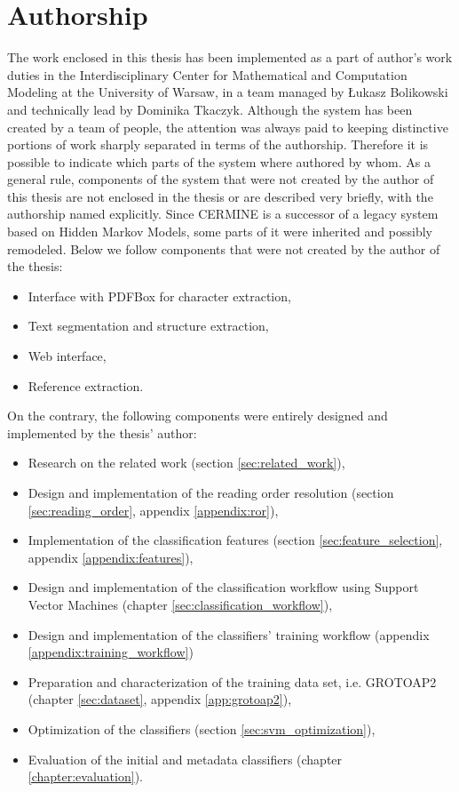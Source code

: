 \section{Authorship}

The work enclosed in this thesis has been implemented as a part of author's work duties in the Interdisciplinary Center for Mathematical and Computation Modeling at the University of Warsaw, in a team managed by Łukasz Bolikowski and technically lead by Dominika Tkaczyk. Although the system has been created by a team of people, the attention was always paid to keeping distinctive portions of work sharply separated in terms of the authorship. Therefore it is possible to indicate which parts of the system where authored by whom. As a general rule, components of the system that were not created by the author of this thesis are not enclosed in the thesis or are described very briefly, with the authorship named explicitly. Since CERMINE is a successor of a legacy system based on Hidden Markov Models, some parts of it were inherited and possibly remodeled. Below we follow components that were not created by the author of the thesis:
\begin{itemize}
\item Interface with PDFBox for character extraction,
\item Text segmentation and structure extraction,
\item Web interface,
\item Reference extraction.
\end{itemize}

On the contrary, the following components were entirely designed and implemented by the thesis' author:
\begin{itemize}
\item Research on the related work (section \ref{sec:related_work}),
\item Design and implementation of the reading order resolution (section \ref{sec:reading_order}, appendix \ref{appendix:ror}),
\item Implementation of the classification features (section \ref{sec:feature_selection}, appendix \ref{appendix:features}),
\item Design and implementation of the classification workflow using Support Vector Machines (chapter \ref{sec:classification_workflow}),
\item Design and implementation of the classifiers' training workflow (appendix \ref{appendix:training_workflow})
\item Preparation and characterization of the training data set, i.e. GROTOAP2 (chapter \ref{sec:dataset}, appendix \ref{app:grotoap2}),
\item Optimization of the classifiers (section \ref{sec:svm_optimization}),
\item Evaluation of the initial and metadata classifiers (chapter \ref{chapter:evaluation}).
\end{itemize}


